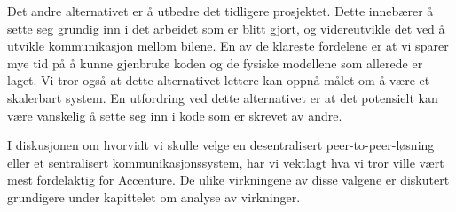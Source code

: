 Det andre alternativet er å utbedre det tidligere prosjektet. Dette innebærer å sette seg grundig inn i det arbeidet som er blitt gjort, og videreutvikle det ved å utvikle kommunikasjon mellom bilene. En av de klareste fordelene er at vi sparer mye tid på å kunne gjenbruke koden og de fysiske modellene som allerede er laget. Vi tror også at dette alternativet lettere kan oppnå målet om å være et skalerbart system. En utfordring ved dette alternativet er at det potensielt kan være vanskelig å sette seg inn i kode som er skrevet av andre. 

I diskusjonen om hvorvidt vi skulle velge en desentralisert peer-to-peer-løsning eller et sentralisert kommunikasjonssystem, har vi vektlagt hva vi tror ville vært mest fordelaktig for Accenture. De ulike virkningene av disse valgene er diskutert grundigere under kapittelet om analyse av virkninger. 
